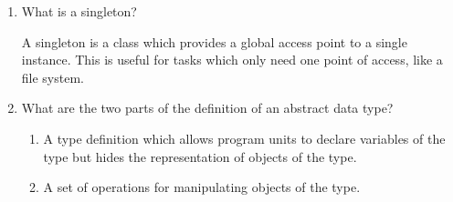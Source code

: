 \begin{enumerate}
\begin{answer}
  \end{answer}

  \item What is a singleton?

  \begin{answer}

    A singleton is a class which provides a global
    access point to a single instance. This is useful
    for tasks which only need one point of access,
    like a file system.

  \end{answer}

  \item What are the two parts of the definition 
    of an abstract data type?

  \begin{answer}

    \begin{enumerate}
      \item A type definition which allows program units
      to declare variables of the type but hides the
      representation of objects of the type.
      \item A set of operations for manipulating objects
      of the type.
    \end{enumerate}

  \end{answer}
\end{enumerate}